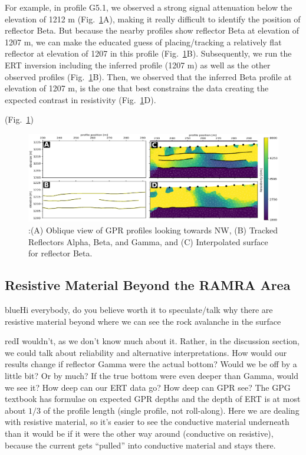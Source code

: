 \documentclass[utf8]{frontiersSCNS}
\newcommand{\COMON}{\begin{color}{blue}}
\newcommand{\COMOFF}{\end{color}}
\newcommand{\alon}{\begin{color}{red}}
\newcommand{\aloff}{\end{color}}
\begin{document}
For example, in profile G5.1, we observed a strong signal attenuation below the elevation of 1212 m (Fig.~\ref{Combined_ABCD}A), making it really difficult to identify the position of reflector Beta. But because the nearby profiles show reflector Beta at elevation of 1207 m, we can make the educated guess of placing/tracking a relatively flat reflector at elevation of 1207 in this profile (Fig.~\ref{Combined_ABCD}B). Subsequently, we run the ERT inversion including the inferred profile (1207 m) as well as the other observed profiles (Fig.~\ref{Combined_ABCD}B). Then, we observed that the inferred Beta profile at elevation of 1207 m, is the one that best constrains the data creating the expected contrast in resistivity (Fig.~\ref{Combined_ABCD}D).  


				(Fig.~\ref{Combined_ABCD})			

                                \begin{figure}[h]

	\includegraphics[width=\textwidth]{Figures/Combined_ABCD.pdf}
		\caption{:(A) Oblique view of GPR profiles looking towards NW, (B) Tracked Reflectors Alpha, Beta, and Gamma, and (C) Interpolated surface for reflector Beta. \label{Combined_ABCD}}

								   \end{figure}



\subsection{Resistive Material Beyond the RAMRA Area}

\COMON Hi everybody, do you believe worth it to speculate/talk why there are resistive material beyond where we can see the rock avalanche in the surface \COMOFF

\alon I wouldn't, as we don't know much about it. Rather, in the discussion section, we could talk about reliability and alternative interpretations. How would our results change if reflector Gamma were the actual bottom? Would we be off by a little bit? Or by much? If the true bottom were even deeper than Gamma, would we see it? How deep can our ERT data go? How deep can GPR see? The GPG textbook has formulae on expected GPR depths and the depth of ERT is at most about $1/3$ of the profile length (single profile, not roll-along). Here we are dealing with resistive material, so it's easier to see the conductive material underneath than it would be if it were the other way around (conductive on resistive), because the current gets ``pulled'' into conductive material and stays there.
\aloff
\end{document}
